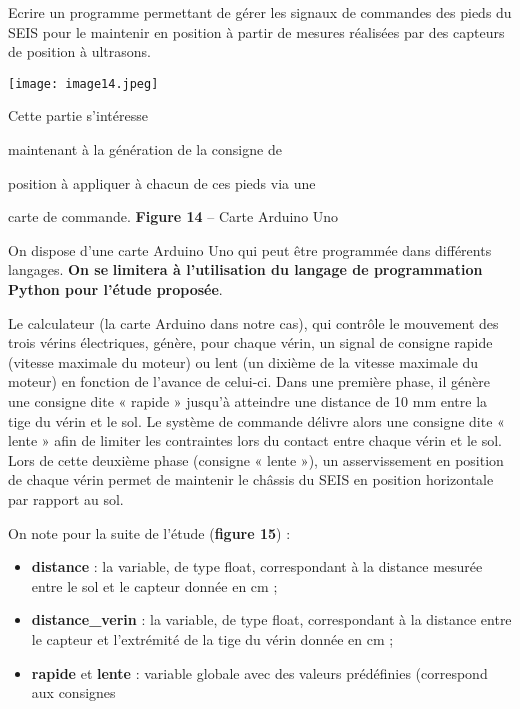 

\begin{obj}
Ecrire un programme permettant de gérer les
signaux de commandes des pieds du SEIS pour le maintenir en position à
partir de mesures réalisées par des capteurs de position à ultrasons.
\end{obj}

\texttt{[image: image14.jpeg]}

Cette partie s'intéresse

maintenant à la génération de la consigne de

position à appliquer à chacun de ces pieds via une

carte de commande. \textbf{Figure 14} -- Carte Arduino Uno

On dispose d'une carte Arduino Uno qui peut être programmée dans
différents langages. \textbf{On se} \textbf{limitera à l'utilisation du
langage de programmation Python pour l'étude proposée}.

Le calculateur (la carte Arduino dans notre cas), qui contrôle le
mouvement des trois vérins électriques, génère, pour chaque vérin, un
signal de consigne rapide (vitesse maximale du moteur) ou lent (un
dixième de la vitesse maximale du moteur) en fonction de l'avance de
celui-ci. Dans une première phase, il génère une consigne dite « rapide
» jusqu'à atteindre une distance de 10 mm entre la tige du vérin et le
sol. Le système de commande délivre alors une consigne dite « lente »
afin de limiter les contraintes lors du contact entre chaque vérin et le
sol. Lors de cette deuxième phase (consigne « lente »), un
asservissement en position de chaque vérin permet de maintenir le
châssis du SEIS en position horizontale par rapport au sol.

On note pour la suite de l'étude (\textbf{figure 15}) :

\begin{itemize}
\item
  \textbf{distance} : la variable, de type float, correspondant à la
  distance mesurée entre le sol et le capteur donnée en cm ;
\item
  \textbf{distance\_verin} : la variable, de type float, correspondant à
  la distance entre le capteur et l'extrémité de la tige du vérin donnée
  en cm ;
\item
  \textbf{rapide} et \textbf{lente} : variable globale avec des valeurs
  prédéfinies (correspond aux consignes
\end{itemize}

